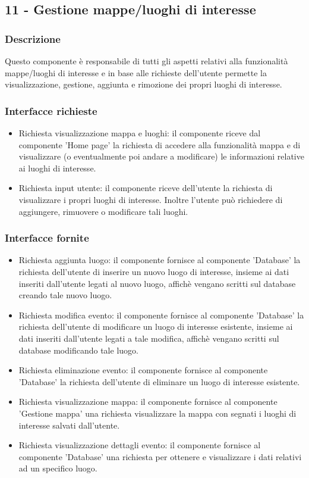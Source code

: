 \documentclass[a4paper,12pt]{article}
\begin{document}
\subsection*{11 -  Gestione mappe/luoghi di interesse}
\subsubsection*{Descrizione}
Questo componente è responsabile di tutti gli aspetti relativi alla funzionalità mappe/luoghi di interesse e in base alle richieste dell'utente permette la visualizzazione, gestione, aggiunta e rimozione dei propri luoghi di interesse.
\subsubsection*{Interfacce richieste}
\begin{itemize} \setlength\itemsep{0.01em}.
\item {\sffamily Richiesta visualizzazione mappa e luoghi}: il componente riceve dal componente 'Home page'  la richiesta di accedere alla funzionalità mappa e di visualizzare (o eventualmente poi andare a modificare) le informazioni relative ai luoghi di interesse.
\item {\sffamily Richiesta input utente}: il componente riceve dell'utente la richiesta di visualizzare i propri luoghi di interesse. Inoltre l'utente può richiedere di aggiungere, rimuovere o modificare tali luoghi.

\end{itemize}

\subsubsection*{Interfacce fornite}
\begin{itemize} \setlength\itemsep{0.01em}
\item {\sffamily Richiesta aggiunta luogo}: il componente fornisce al componente 'Database' la richiesta dell'utente di inserire un nuovo luogo di interesse, insieme ai dati inseriti dall'utente legati al nuovo luogo, affichè vengano scritti sul database creando tale nuovo luogo.
\item {\sffamily Richiesta modifica evento}: il componente fornisce al componente 'Database'  la richiesta dell'utente di modificare un luogo di interesse esistente, insieme ai dati inseriti dall'utente legati a tale modifica, affichè vengano scritti sul database modificando tale luogo.
\item {\sffamily Richiesta eliminazione evento}: il componente fornisce al componente 'Database'  la richiesta dell'utente di eliminare un luogo di interesse esistente.
\item {\sffamily Richiesta visualizzazione mappa}: il componente fornisce al componente 'Gestione mappa' una richiesta visualizzare la mappa con segnati i luoghi di interesse salvati dall'utente.
\item {\sffamily Richiesta visualizzazione dettagli evento}: il componente fornisce al componente 'Database' una richiesta per ottenere e visualizzare i dati relativi ad un specifico luogo.
\end{itemize}
\end{document}
